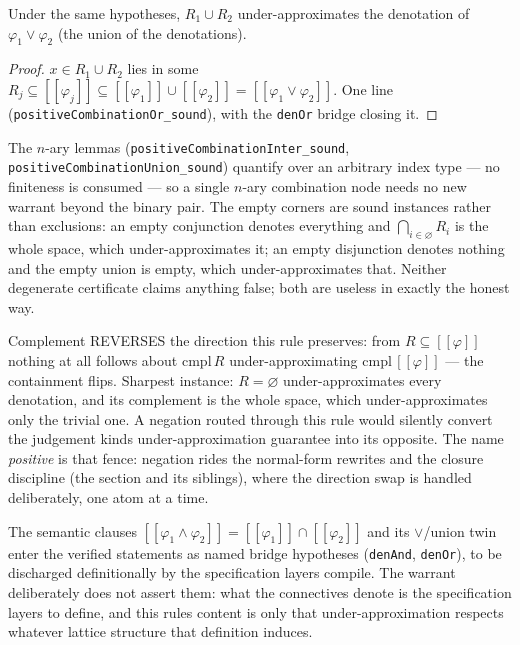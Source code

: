 \begin{bprop}\label{prop:pcr-or}
Under the same hypotheses, $R_1 \cup R_2$ under-approximates the
denotation of $\varphi_1 \vee \varphi_2$ (the union of the
denotations).
\end{bprop}
\begin{proof}
$x \in R_1 \cup R_2$ lies in some $R_j \subseteq [\![\varphi_j]\!]
\subseteq [\![\varphi_1]\!] \cup [\![\varphi_2]\!] =
[\![\varphi_1 \vee \varphi_2]\!]$. One line
(\texttt{positiveCombinationOr\_sound}), with the \texttt{denOr}
bridge closing it.
\end{proof}

\begin{bremark}
The $n$-ary lemmas (\texttt{positiveCombinationInter\_sound},
\texttt{positiveCombinationUnion\_sound}) quantify over an arbitrary
index type --- no finiteness is consumed --- so a single $n$-ary
combination node needs no new warrant beyond the binary pair. The
empty corners are sound instances rather than exclusions: an empty
conjunction denotes everything and $\bigcap_{i \in \varnothing} R_i$
is the whole space, which under-approximates it; an empty disjunction
denotes nothing and the empty union is empty, which
under-approximates that. Neither degenerate certificate claims
anything false; both are useless in exactly the honest way.
\end{bremark}

\begin{bremark}
Complement REVERSES the direction this rule preserves: from
$R \subseteq [\![\varphi]\!]$ nothing at all follows about
$\mathrm{cmpl}\,R$ under-approximating
$\mathrm{cmpl}\,[\![\varphi]\!]$ --- the containment flips. Sharpest
instance: $R = \varnothing$ under-approximates every denotation, and
its complement is the whole space, which under-approximates only the
trivial one. A negation routed through this rule would silently
convert the judgement kind\textquotesingle s under-approximation
guarantee into its opposite. The name \emph{positive} is that fence:
negation rides the normal-form rewrites and the closure discipline
(the  section and its siblings),
where the direction swap is handled deliberately, one atom at a time.
\end{bremark}

\begin{bremark}
The semantic clauses $[\![\varphi_1 \wedge \varphi_2]\!] =
[\![\varphi_1]\!] \cap [\![\varphi_2]\!]$ and its $\vee$/union twin
enter the verified statements as named bridge hypotheses
(\texttt{denAnd}, \texttt{denOr}), to be discharged definitionally by
the specification layer\textquotesingle s compile. The warrant
deliberately does not assert them: what the connectives denote is the
specification layer\textquotesingle s to define, and this
rule\textquotesingle s content is only that under-approximation
respects whatever lattice structure that definition induces.
\end{bremark}

